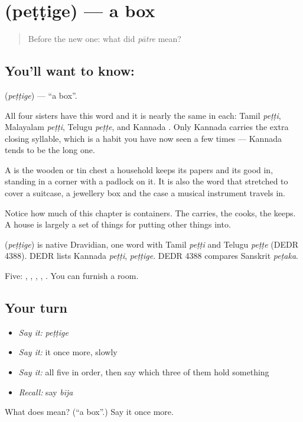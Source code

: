 \section[\texorpdfstring{\kn{ಪೆಟ್ಟಿಗೆ} (peṭṭige)}{ಪೆಟ್ಟಿಗೆ (peṭṭige)}]{ (peṭṭige) — a box}

\label{lesson:KA-C56-box}



\begin{quote}
Before the new one: what did \emph{pātre} mean?
\end{quote}

\subsection*{You'll want to know: }
\textbf{} (\emph{peṭṭige}) — \textquotedblleft{}a box\textquotedblright{}.

All four sisters have this word and it is nearly the same in each: Tamil \emph{peṭṭi}, Malayalam \emph{peṭṭi}, Telugu \emph{peṭṭe}, and Kannada . Only Kannada carries the extra closing syllable, which is a habit you have now seen a few times — Kannada tends to be the long one.

A  is the wooden or tin chest a household keeps its papers and its good  in, standing in a corner with a padlock on it. It is also the word that stretched to cover a suitcase, a jewellery box and the case a musical instrument travels in.

Notice how much of this chapter is containers. The  carries, the  cooks, the  keeps. A house is largely a set of things for putting other things into.

\begin{cousinweb}
\textbf{} (\emph{peṭṭige}) is native Dravidian, one word with Tamil \emph{peṭṭi} and Telugu \emph{peṭṭe} (DEDR 4388). DEDR lists Kannada \emph{peṭṭi}, \emph{peṭṭige}. DEDR 4388 compares Sanskrit \emph{peṭaka}.
\end{cousinweb}

\begin{grammarlens}[title={What you've built}]
Five: , , , , . You can furnish a room.
\end{grammarlens}

\subsection*{Your turn}
\begin{itemize}
\raggedright
  \item \emph{Say it:} \emph{peṭṭige}
  \item \emph{Say it:} it once more, slowly
  \item \emph{Say it:} all five in order, then say which three of them hold something
  \item \emph{Recall:} say \emph{bīja}
\end{itemize}

\begin{tcolorbox}[breakable,colback=teal!4,colframe=teal!35!black,title={Before you move on}]
What does  mean? (\textquotedblleft{}a box\textquotedblright{}.) Say it once more.
\end{tcolorbox}

